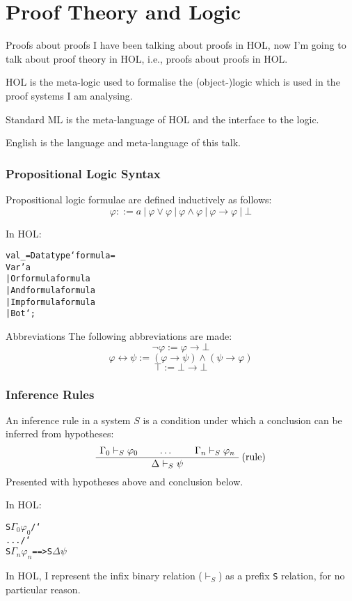 \documentclass[english,svgnames,hide notes,12pt]{beamer}
\theoremstyle{definition}
\theoremstyle{remark}
\begin{document}
\section{Proof Theory and Logic}

\begin{frame}{Proofs about proofs}
    I have been talking about proofs in HOL, now I'm going to talk about proof theory in HOL, i.e., proofs about proofs in HOL.

    \bigskip
    HOL is the meta-logic used to formalise the (object-)logic which is used in the proof systems I am analysing.

    \bigskip
    Standard ML is the meta-language of HOL and the interface to the logic.

    \bigskip
    English is the language and meta-language of this talk.
\end{frame}

\begin{frame}[fragile]
    \frametitle{Propositional Logic Syntax}
    Propositional logic formulae are defined inductively as follows:
    \[ \varphi ::= a~|~\varphi \lor \varphi~|~\varphi \land \varphi~|~\varphi \to \varphi~|~\bot \]

    \bigskip
    In HOL:
    \small
\begin{alltt}
val _ = Datatype `formula =
    Var 'a
    | Or formula formula
    | And formula formula
    | Imp formula formula
    | Bot`;
\end{alltt}
\end{frame}

\begin{frame}{Abbreviations}
  The following abbreviations are made:
  \[ \neg \varphi := \varphi \to \bot \]
  \[ \varphi \leftrightarrow \psi := (\varphi \to \psi) \land (\psi \to \varphi) \]
  \[ \top := \bot \to \bot \]
\end{frame}

\newcommand{\bs}{\char`\\}
\begin{frame}[fragile]
    \frametitle{Inference Rules}
    An inference rule in a system $S$ is a condition under which a conclusion can be inferred from hypotheses:
    \[
        \AxiomC{$\Gamma_0 \vdash_S \varphi_0$}
        \AxiomC{$\dots$}
        \AxiomC{$\Gamma_n \vdash_S \varphi_n$}
        \RightLabel{(rule)}
        \TrinaryInfC{$\Delta \vdash_S \psi$}
        \DisplayProof
    \]
    Presented with hypotheses above and conclusion below.

    \bigskip
    In HOL:
    \begin{alltt}
        S \(\Gamma_0\) \(\varphi_0\) /\bs{} ... /\bs{} S \(\Gamma_n\) \(\varphi_n\) ==> S \(\Delta\) \(\psi\)
    \end{alltt}

    In HOL, I represent the infix binary relation ($\vdash_S$) as a prefix \texttt{S} relation, for no particular reason.
\end{frame}
\end{document}
